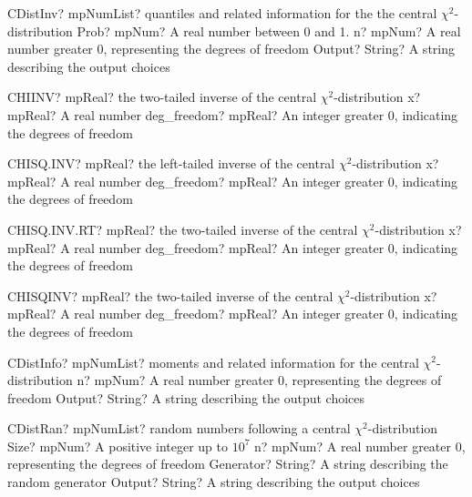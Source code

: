 \documentclass[12pt,a4paper,openany]{book}
\begin{document}
\begin{mpFunctionsExtract}
\mpFunctionThreeNotImplemented
{CDistInv? mpNumList? quantiles and related information for the the central $\chi^2$-distribution}
{Prob? mpNum? A real number between 0 and 1.}
{n? mpNum? A real number greater 0, representing the degrees of freedom}
{Output? String? A string describing the output choices}
\end{mpFunctionsExtract}

\begin{mpFunctionsExtract}
\mpWorksheetFunctionTwoNotImplemented
{CHIINV? mpReal? the two-tailed inverse of the central $\chi^2$-distribution}
{x? mpReal? A real number}
{deg\_freedom? mpReal? An integer  greater 0, indicating the degrees of freedom}
\end{mpFunctionsExtract}

\begin{mpFunctionsExtract}
\mpWorksheetFunctionTwoNotImplemented
{CHISQ.INV? mpReal? the left-tailed inverse of the central $\chi^2$-distribution}
{x? mpReal? A real number}
{deg\_freedom? mpReal? An integer  greater 0, indicating the degrees of freedom}
\end{mpFunctionsExtract}

\begin{mpFunctionsExtract}
\mpWorksheetFunctionTwoNotImplemented
{CHISQ.INV.RT? mpReal? the two-tailed inverse of the central $\chi^2$-distribution}
{x? mpReal? A real number}
{deg\_freedom? mpReal? An integer  greater 0, indicating the degrees of freedom}
\end{mpFunctionsExtract}

\begin{mpFunctionsExtract}
\mpWorksheetFunctionTwoNotImplemented
{CHISQINV? mpReal? the two-tailed inverse of the central $\chi^2$-distribution}
{x? mpReal? A real number}
{deg\_freedom? mpReal? An integer  greater 0, indicating the degrees of freedom}
\end{mpFunctionsExtract}

\begin{mpFunctionsExtract}
\mpFunctionTwoNotImplemented
{CDistInfo? mpNumList? moments and related information for the central $\chi^2$-distribution}
{n? mpNum? A real number greater 0, representing the degrees of freedom}
{Output? String? A string describing the output choices}
\end{mpFunctionsExtract}

\begin{mpFunctionsExtract}
\mpFunctionFourNotImplemented
{CDistRan? mpNumList? random numbers following a central $\chi^2$-distribution}
{Size? mpNum? A positive integer up to $10^7$}
{n? mpNum? A real number greater 0, representing the degrees of freedom}
{Generator? String? A string describing the random generator}
{Output? String? A string describing the output choices}
\end{mpFunctionsExtract}
\end{document}
